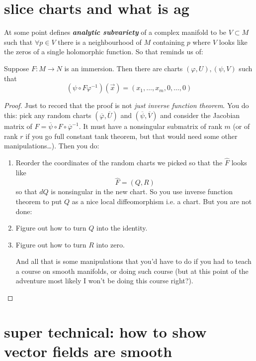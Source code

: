 \section{slice charts and what is ag}

At some point \cite{gri} defines \textit{\textbf{analytic subvariety}} of a complex manifold to be \(V \subset M\) such that \(\forall p \in V\) there is a neighbourhood of \(M\) containing \(p\) where \(V\) looks like the zeros of a single holomorphic function. So that reminds us of:

\begin{thm}\leavevmode
Suppose \(F:M \to N\) is an immersion. Then there are charts \((\varphi,U),(\psi,V)\) such that
\[(\psi \circ F \varphi^{-1})(\vec{x})=(x_1,\ldots,x_m,0,\ldots,0)\]
\end{thm}

\begin{proof}\leavevmode
Just to record that the proof is not \textit{just inverse function theorem}. You do this: pick any random charts \((\overline{\varphi},\overline{U})\) and \((\overline{\psi},\overline{V})\) and consider the Jacobian matrix of \(\hat{F}=\overline{\psi}\circ F \circ \overline{\varphi}^{-1}\). It must have a nonsingular submatrix of rank \(m\) (or of rank \(r\) if you go full constant tank theorem, but that would need some other manipulations…). Then you do:
\begin{enumerate}
\item Reorder the coordinates of the random charts we picked so that the \(\hat{F}\) looks like
	\[\hat{F}=(Q,R)\]
	so that \(dQ\) is nonsingular in the new chart. So you use inverse function theorem to put \(Q\) as a nice local diffeomorphism i.e. a chart. But you are not done:
 \item Figure out how to turn \(Q\) into the identity.
\item Figure out how to turn \(R\) into zero.

	And all that is some manipulations that you'd have to do if you had to teach a course on smooth manifolds, or doing such course (but at this point of the adventure most likely I won't be doing this course right?).
\end{enumerate}
\end{proof}

\section{super technical: how to show vector fields are smooth}

